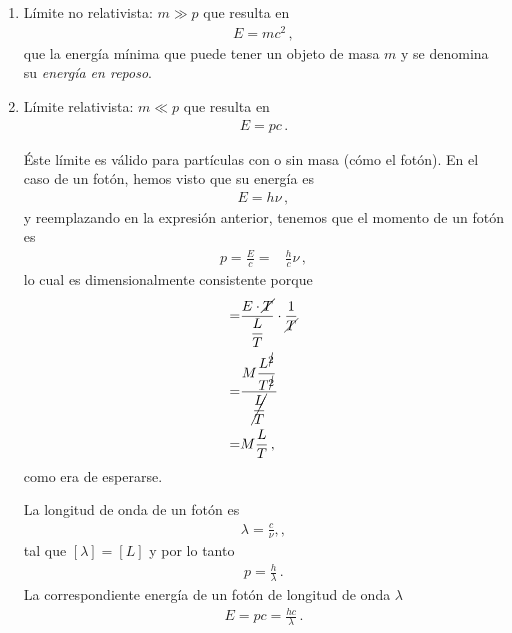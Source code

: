 \documentclass[11pt,a4paper]{book}
\begin{document}
\begin{enumerate}
    \item Límite no relativista: $m\gg p$ que resulta en 
    \begin{align*}
        E = m c^2\,,
    \end{align*}
    que la energía mínima que puede tener un objeto de masa $m$ y se denomina su \emph{energía en reposo}.
    \item Límite relativista: $m \ll p$ que resulta en
    \begin{align*}
        E = pc\,.
    \end{align*}

    Éste límite es válido para partículas con o sin masa (cómo el fotón).  En el caso de un fotón, hemos visto que su energía es 
    \begin{align}
    \label{eq:energiafoton}
        E=h\nu\,,
    \end{align}
    y reemplazando en la expresión anterior, tenemos que el momento de un fotón es 
    \begin{align}
        p=\frac{E}{c} =& \frac{h}{c}\nu\,,
    \end{align}
    lo cual es dimensionalmente consistente porque
    \begin{align}
        [p] =&\frac{E\cdot \cancel{T}}{\dfrac{L}{T}}\cdot \frac{1}{\cancel{T}}\nonumber\\
         =& \frac{M \dfrac{L^{\cancel{2}}}{T^{\cancel{2}}}}{\cancel{\dfrac{L}{T}}}\nonumber\\
        = &M \frac{L}{T}\,,
    \end{align}
    como era de esperarse. 

    La longitud de onda de un fotón es
    \begin{align}
        \lambda =\frac{c}{\nu},,
    \end{align}
tal que $[\lambda] = [L]$ y por lo tanto
\begin{align}
    p =\frac{h}{\lambda}\,.
\end{align}
La correspondiente energía de un fotón de longitud de onda $\lambda$
\begin{align}
E = pc =\frac{hc}{\lambda}\,.    
\end{align}

\end{enumerate}
\end{document}
